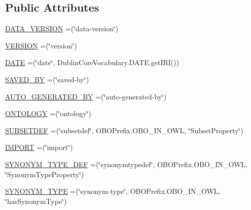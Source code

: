 \subsection*{Public Attributes}
\begin{DoxyCompactItemize}
\item 
\hyperlink{enumorg_1_1coode_1_1owlapi_1_1obo_1_1parser_1_1_o_b_o_vocabulary_ac6d4c43cae342ca5cf7abed276ae38ce}{D\-A\-T\-A\-\_\-\-V\-E\-R\-S\-I\-O\-N} =(\char`\"{}data-\/version\char`\"{})
\item 
\hyperlink{enumorg_1_1coode_1_1owlapi_1_1obo_1_1parser_1_1_o_b_o_vocabulary_a715039f4a9ccd5aa173a9a8183c85bc3}{V\-E\-R\-S\-I\-O\-N} =(\char`\"{}version\char`\"{})
\item 
\hyperlink{enumorg_1_1coode_1_1owlapi_1_1obo_1_1parser_1_1_o_b_o_vocabulary_a8c1b706f1bd16203c3183fb4283ea96c}{D\-A\-T\-E} =(\char`\"{}date\char`\"{}, Dublin\-Core\-Vocabulary.\-D\-A\-T\-E.\-get\-I\-R\-I())
\item 
\hyperlink{enumorg_1_1coode_1_1owlapi_1_1obo_1_1parser_1_1_o_b_o_vocabulary_a4141956e59e3bc8a5abfb5657f4a883d}{S\-A\-V\-E\-D\-\_\-\-B\-Y} =(\char`\"{}saved-\/by\char`\"{})
\item 
\hyperlink{enumorg_1_1coode_1_1owlapi_1_1obo_1_1parser_1_1_o_b_o_vocabulary_a93f74840ed13894488cc3b2a73a06410}{A\-U\-T\-O\-\_\-\-G\-E\-N\-E\-R\-A\-T\-E\-D\-\_\-\-B\-Y} =(\char`\"{}auto-\/generated-\/by\char`\"{})
\item 
\hyperlink{enumorg_1_1coode_1_1owlapi_1_1obo_1_1parser_1_1_o_b_o_vocabulary_a21ee99cf7b26d625ef790b87498ecbd1}{O\-N\-T\-O\-L\-O\-G\-Y} =(\char`\"{}ontology\char`\"{})
\item 
\hyperlink{enumorg_1_1coode_1_1owlapi_1_1obo_1_1parser_1_1_o_b_o_vocabulary_af182e77c13ae82a4aa82c85a0174bcf5}{S\-U\-B\-S\-E\-T\-D\-E\-F} =(\char`\"{}subsetdef\char`\"{}, O\-B\-O\-Prefix.\-O\-B\-O\-\_\-\-I\-N\-\_\-\-O\-W\-L, \char`\"{}Subset\-Property\char`\"{})
\item 
\hyperlink{enumorg_1_1coode_1_1owlapi_1_1obo_1_1parser_1_1_o_b_o_vocabulary_a90859a9a6dad13a383109bbaf0edfb15}{I\-M\-P\-O\-R\-T} =(\char`\"{}import\char`\"{})
\item 
\hyperlink{enumorg_1_1coode_1_1owlapi_1_1obo_1_1parser_1_1_o_b_o_vocabulary_a5e4b90978528c71248f29b3e6259ac66}{S\-Y\-N\-O\-N\-Y\-M\-\_\-\-T\-Y\-P\-E\-\_\-\-D\-E\-F} =(\char`\"{}synonymtypedef\char`\"{}, O\-B\-O\-Prefix.\-O\-B\-O\-\_\-\-I\-N\-\_\-\-O\-W\-L, \char`\"{}Synonym\-Type\-Property\char`\"{})
\item 
\hyperlink{enumorg_1_1coode_1_1owlapi_1_1obo_1_1parser_1_1_o_b_o_vocabulary_a998793ca8d433db875ccd9e5975548d4}{S\-Y\-N\-O\-N\-Y\-M\-\_\-\-T\-Y\-P\-E} =(\char`\"{}synonym-\/type\char`\"{}, O\-B\-O\-Prefix.\-O\-B\-O\-\_\-\-I\-N\-\_\-\-O\-W\-L, \char`\"{}has\-Synonym\-Type\char`\"{})

\end{DoxyCompactItemize}

